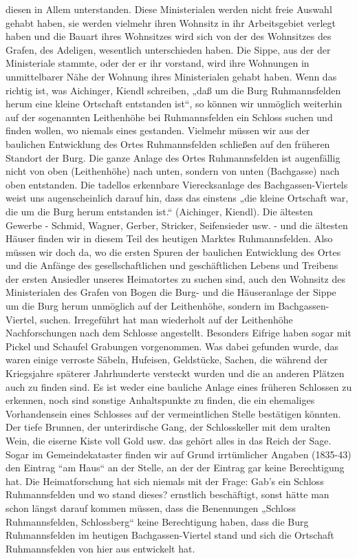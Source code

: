 \documentclass[12pt,a4paper]{book}
\begin{document}
diesen in Allem unterstanden. Diese Ministerialen werden nicht freie Auswahl
gehabt haben, sie werden vielmehr ihren Wohnsitz in ihr Arbeitsgebiet verlegt
haben und die Bauart ihres Wohnsitzes wird sich von der des Wohnsitzes des
Grafen, des Adeligen, wesentlich unterschieden haben. Die Sippe, aus der der
Ministeriale stammte, oder der er ihr vorstand, wird ihre Wohnungen in
unmittelbarer Nähe der Wohnung ihres Ministerialen gehabt haben. Wenn das
richtig ist, was Aichinger, Kiendl schreiben, „daß um die Burg Ruhmannsfelden
herum eine kleine Ortschaft entstanden ist“, so können wir unmöglich weiterhin
auf der sogenannten Leithenhöhe bei Ruhmannsfelden ein Schloss suchen und finden
wollen, wo niemals eines gestanden. Vielmehr müssen wir aus der baulichen
Entwicklung des Ortes Ruhmannsfelden schließen auf den früheren Standort der
Burg. Die ganze Anlage des Ortes Ruhmannsfelden ist augenfällig nicht von oben
(Leithenhöhe) nach unten, sondern von unten (Bachgasse) nach oben entstanden.
Die tadellos erkennbare Vierecksanlage des Bachgassen-Viertels weist uns
augenscheinlich darauf hin, dass das einstens „die kleine Ortschaft war, die um
die Burg herum entstanden ist.“ (Aichinger, Kiendl). Die ältesten Gewerbe -
Schmid, Wagner, Gerber, Stricker, Seifensieder usw. - und die ältesten Häuser
finden wir in diesem Teil des heutigen Marktes Ruhmannsfelden. Also müssen wir
doch da, wo die ersten Spuren der baulichen Entwicklung des Ortes und die
Anfänge des gesellschaftlichen und geschäftlichen Lebens und Treibens der ersten
Ansiedler unseres Heimatortes zu suchen sind, auch den Wohnsitz des
Ministerialen des Grafen von Bogen die Burg- und die Häuseranlage der Sippe um
die Burg herum unmöglich auf der Leithenhöhe, sondern im Bachgassen-Viertel,
suchen. Irregeführt hat man wiederholt auf der Leithenhöhe Nachforschungen nach
dem Schlosse angestellt. Besonders Eifrige haben sogar mit Pickel und Schaufel
Grabungen vorgenommen. Was dabei gefunden wurde, das waren einige verroste
Säbeln, Hufeisen, Geldstücke, Sachen, die während der Kriegsjahre späterer
Jahrhunderte versteckt wurden und die an anderen Plätzen auch zu finden sind. Es
ist weder eine bauliche Anlage eines früheren Schlossen zu erkennen, noch sind
sonstige Anhaltspunkte zu finden, die ein ehemaliges Vorhandensein eines
Schlosses auf der vermeintlichen Stelle bestätigen könnten. Der tiefe Brunnen,
der unterirdische Gang, der Schlosskeller mit dem uralten Wein, die eiserne
Kiste voll Gold usw. das gehört alles in das Reich der Sage. Sogar im
Gemeindekataster finden wir auf Grund irrtümlicher Angaben (1835-43) den Eintrag
“am Haus“ an der Stelle, an der der Eintrag gar keine Berechtigung hat. Die
Heimatforschung hat sich niemals mit der Frage: Gab’s ein Schloss Ruhmannsfelden
und wo stand dieses? ernstlich beschäftigt, sonst hätte man schon längst darauf
kommen müssen, dass die Benennungen „Schloss Ruhmannsfelden, Schlossberg“ keine
Berechtigung haben, dass die Burg Ruhmannsfelden im heutigen Bachgassen-Viertel
stand und sich die Ortschaft Ruhmannsfelden von hier aus entwickelt hat.
\end{document}
